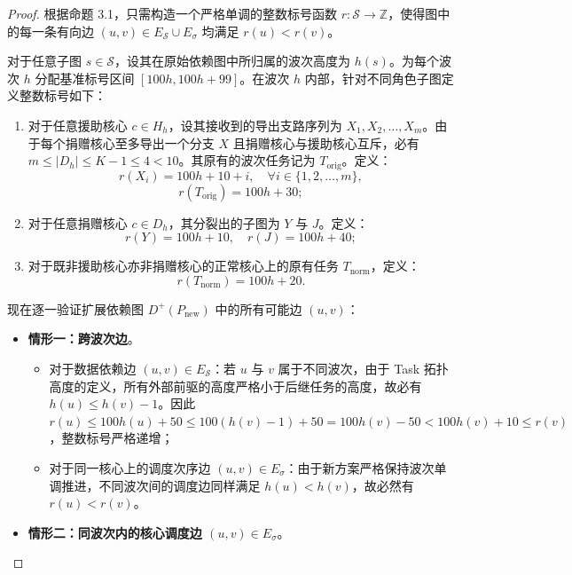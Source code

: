 \documentclass[anonymous,withtoc]{gmcm2026}
\providecommand{\tightlist}{\setlength{\itemsep}{0pt}\setlength{\parskip}{0pt}}
\begin{document}
\begin{proof} 根据命题 3.1，只需构造一个严格单调的整数标号函数 \(r: \mathcal{S} \to \mathbb{Z}\)，使得图中的每一条有向边 \((u, v) \in E_{\mathcal{S}} \cup E_\sigma\) 均满足 \(r(u) < r(v)\)。

对于任意子图 \(s \in \mathcal{S}\)，设其在原始依赖图中所归属的波次高度为 \(h(s)\)。为每个波次 \(h\) 分配基准标号区间 \([100h, 100h + 99]\)。在波次 \(h\) 内部，针对不同角色子图定义整数标号如下：

\begin{enumerate}
\def\labelenumi{\arabic{enumi}.}
\tightlist
\item
  对于任意援助核心 \(c \in H_h\)，设其接收到的导出支路序列为 \(X_1, X_2, \dots, X_m\)。由于每个捐赠核心至多导出一个分支 \(X\) 且捐赠核心与援助核心互斥，必有 \(m \le |D_h| \le K - 1 \le 4 < 10\)。其原有的波次任务记为 \(T_{\mathrm{orig}}\)。定义： \begin{equation}
r(X_i) = 100h + 10 + i, \quad \forall i \in \{1, 2, \dots, m\},
\end{equation} \begin{equation}
r(T_{\mathrm{orig}}) = 100h + 30;
\end{equation}
\item
  对于任意捐赠核心 \(c \in D_h\)，其分裂出的子图为 \(Y\) 与 \(J\)。定义： \begin{equation}
r(Y) = 100h + 10, \quad r(J) = 100h + 40;
\end{equation}
\item
  对于既非援助核心亦非捐赠核心的正常核心上的原有任务 \(T_{\mathrm{norm}}\)，定义： \begin{equation}
r(T_{\mathrm{norm}}) = 100h + 20.
\end{equation}
\end{enumerate}

现在逐一验证扩展依赖图 \(D^+(P_{\mathrm{new}})\) 中的所有可能边 \((u, v)\)：

\begin{itemize}
\tightlist
\item
  \textbf{情形一：跨波次边}。

  \begin{itemize}
  \tightlist
  \item
    对于数据依赖边 \((u, v) \in E_{\mathcal{S}}\)：若 \(u\) 与 \(v\) 属于不同波次，由于 Task 拓扑高度的定义，所有外部前驱的高度严格小于后继任务的高度，故必有 \(h(u) \le h(v) - 1\)。因此 \(r(u) \le 100h(u) + 50 \le 100(h(v) - 1) + 50 = 100h(v) - 50 < 100h(v) + 10 \le r(v)\)，整数标号严格递增；
  \item
    对于同一核心上的调度次序边 \((u, v) \in E_\sigma\)：由于新方案严格保持波次单调推进，不同波次间的调度边同样满足 \(h(u) < h(v)\)，故必然有 \(r(u) < r(v)\)。
  \end{itemize}
\item
  \textbf{情形二：同波次内的核心调度边 \((u, v) \in E_\sigma\)}。


\end{itemize}
\end{proof}
\end{document}

